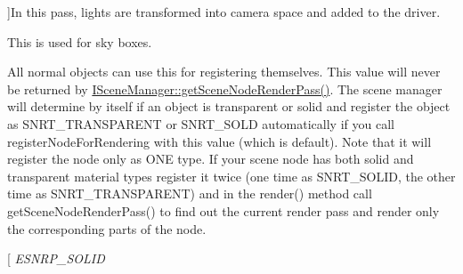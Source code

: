 \begin{Desc}
\begin{description}
{}]In this pass, lights are transformed into camera space and added to the driver. \item[{\em 
E\+S\+N\+R\+P\+\_\+\+S\+K\+Y\+\_\+\+B\+OX\hypertarget{namespaceirr_1_1scene_a7862269bd1abc123929d4dbb8200d67fac41f4cb4900e84b9e55462089d0e3cb8}{}\label{namespaceirr_1_1scene_a7862269bd1abc123929d4dbb8200d67fac41f4cb4900e84b9e55462089d0e3cb8}
}]This is used for sky boxes. \item[{\em 
E\+S\+N\+R\+P\+\_\+\+A\+U\+T\+O\+M\+A\+T\+IC\hypertarget{namespaceirr_1_1scene_a7862269bd1abc123929d4dbb8200d67fa5ceee6e4bc2fab42c663b32018e276e8}{}\label{namespaceirr_1_1scene_a7862269bd1abc123929d4dbb8200d67fa5ceee6e4bc2fab42c663b32018e276e8}
}]All normal objects can use this for registering themselves. This value will never be returned by \hyperlink{classirr_1_1scene_1_1ISceneManager_a7f92b38444d719c4d2314242884e4951}{I\+Scene\+Manager\+::get\+Scene\+Node\+Render\+Pass()}. The scene manager will determine by itself if an object is transparent or solid and register the object as S\+N\+R\+T\+\_\+\+T\+R\+A\+N\+S\+P\+A\+R\+E\+NT or S\+N\+R\+T\+\_\+\+S\+O\+LD automatically if you call register\+Node\+For\+Rendering with this value (which is default). Note that it will register the node only as O\+NE type. If your scene node has both solid and transparent material types register it twice (one time as S\+N\+R\+T\+\_\+\+S\+O\+L\+ID, the other time as S\+N\+R\+T\+\_\+\+T\+R\+A\+N\+S\+P\+A\+R\+E\+NT) and in the render() method call get\+Scene\+Node\+Render\+Pass() to find out the current render pass and render only the corresponding parts of the node. \item[{\em 
E\+S\+N\+R\+P\+\_\+\+S\+O\+L\+ID\hypertarget{namespaceirr_1_1scene_a7862269bd1abc123929d4dbb8200d67fad058b020ab42ad745cc03fe379148e1f}{}\label{namespaceirr_1_1scene_a7862269bd1abc123929d4dbb8200d67fad058b020ab42ad745cc03fe379148e1f}
}
\end{description}
\end{Desc}
